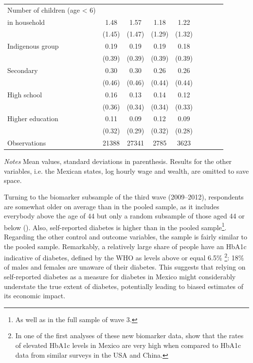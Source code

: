\begin{table}[p]
\begin{adjustbox}{max width=\linewidth, center}
\begin{threeparttable}
{\begin{tabular}{l*{4}{SS}}
Number of children (age < 6) &&&&\\
in household&        1.48&        1.57&        1.18&        1.22\\
                    &      (1.45)&      (1.47)&      (1.29)&      (1.32)\\
Indigenous group    &        0.19&        0.19&        0.19&        0.18\\
                    &      (0.39)&      (0.39)&      (0.39)&      (0.39)\\
Secondary           &        0.30&        0.30&        0.26&        0.26\\
                    &      (0.46)&      (0.46)&      (0.44)&      (0.44)\\
High school         &        0.16&        0.13&        0.14&        0.12\\
                    &      (0.36)&      (0.34)&      (0.34)&      (0.33)\\
Higher education    &        0.11&        0.09&        0.12&        0.09\\
                    &      (0.32)&      (0.29)&      (0.32)&      (0.28)\\
\midrule
Observations        &    21388&       27341&        2785&        3623\\
\bottomrule
\end{tabular}
\begin{tablenotes}
\item \footnotesize \textit{Notes} Mean values, standard deviations in parenthesis. Results for the other variables, i.e. the Mexican states, log hourly wage and wealth, are omitted to save space.
\end{tablenotes}
}
\end{threeparttable}
\end{adjustbox}
\end{table}


Turning to the biomarker subsample of the third wave (2009--2012), respondents are somewhat older on average than in the pooled sample, as it includes everybody above the age of 44 but only a random subsample of those aged 44 or below (\cite{Crimmins2015}). Also, self-reported diabetes is higher than in the pooled sample\footnote{As well as in the full sample of wave 3.}. Regarding the other control and outcome variables, the sample is fairly similar to the pooled sample. Remarkably, a relatively large share of people have an \ac{HbA1c} indicative of diabetes, defined by the \ac{WHO} as levels above or equal 6.5\% \parencite{WorldHealthOrganization2011}\footnote{In one of the first analyses of these new biomarker data, \textcite{Frankenberg2015} show that the rates of elevated \ac{HbA1c} levels in Mexico are very high when compared to \ac{HbA1c} data from similar surveys in the USA and China.}: 18\% of males and females are unaware of their diabetes. This suggests that relying on self-reported diabetes as a measure for diabetes in Mexico might considerably understate the true extent of diabetes, potentially leading to biased estimates of its economic impact.

